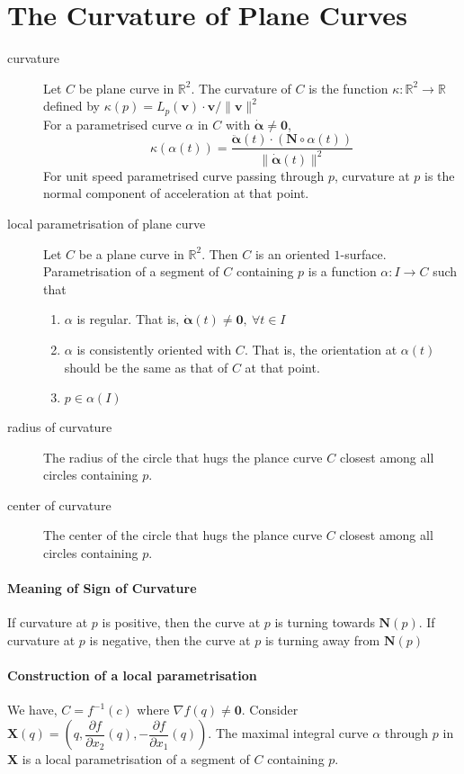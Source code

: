 \section{The Curvature of Plane Curves}
\begin{description}
	\item[curvature] Let $C$ be plane curve in $\mathbb{R}^2$. The curvature of $C$ is the function $\kappa : \mathbb{R}^2 \to \mathbb{R}$ defined by $\kappa(p) = L_p(\mathbf{v}) \cdot \mathbf{v} /\|\mathbf{v}\|^2$\\

	For a parametrised curve $\alpha$ in $C$ with $\dot{\boldsymbol{\alpha}} \ne \mathbf{0}$,
		$$\kappa(\alpha(t)) = \frac{\ddot{\boldsymbol{\alpha}}(t) \cdot (\mathbf{N} \circ \alpha(t))}{\| \dot{\boldsymbol{\alpha}}(t)\|^2}$$
		For unit speed parametrised curve passing through $p$, curvature at $p$ is the normal component of acceleration at that point.
	\item[local parametrisation of plane curve] Let $C$ be a plane curve in $\mathbb{R}^2$. Then $C$ is an oriented $1$-surface. Parametrisation of a segment of $C$ containing $p$ is a function $\alpha : I \to C$ such that
	\begin{enumerate}
		\item $\alpha$ is regular. That is, $\dot{\boldsymbol{\alpha}}(t) \ne \mathbf{0},\ \forall t \in I$
		\item $\alpha$ is consistently oriented with $C$. That is, the orientation at $\alpha(t)$ should be the same as that of $C$ at that point.
		\item $p \in \alpha(I)$
	\end{enumerate}
	\item[radius of curvature] The radius of the circle that hugs the plance curve $C$ closest among all circles containing $p$.
	\item[center of curvature] The center of the circle that hugs the plance curve $C$ closest among all circles containing $p$.
\end{description}

\paragraph{Meaning of Sign of Curvature}
	If curvature at $p$ is positive, then the curve at $p$ is turning towards $\mathbf{N}(p)$. If curvature at $p$ is negative, then the curve at $p$ is turning away from $\mathbf{N}(p)$

\paragraph{Construction of a local parametrisation}
	We have, $C = f^{-1}(c)$ where $\nabla f(q) \ne \mathbf{0}$. Consider $\mathbf{X}(q) =\left( q,\dfrac{\partial f}{\partial x_2}(q),-\dfrac{\partial f}{\partial x_1}(q) \right)$. The maximal integral curve $\alpha$ through $p$ in $\mathbf{X}$ is a local parametrisation of a segment of $C$ containing $p$.

